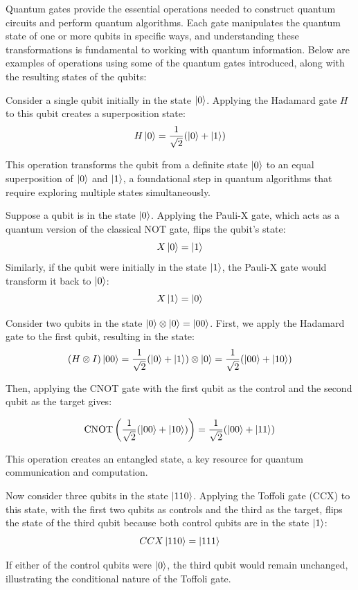 \documentclass{article}
\begin{document}
	Quantum gates provide the essential operations needed to construct quantum circuits and perform quantum algorithms. Each gate manipulates the quantum state of one or more qubits in specific ways, and understanding these transformations is fundamental to working with quantum information. Below are examples of operations using some of the quantum gates introduced, along with the resulting states of the qubits:

	Consider a single qubit initially in the state \( \ket{0} \). Applying the Hadamard gate \( H \) to this qubit creates a superposition state:
	\[
	H \ket{0} = \frac{1}{\sqrt{2}} (\ket{0} + \ket{1})
	\]

	This operation transforms the qubit from a definite state \( \ket{0} \) to an equal superposition of \( \ket{0} \) and \( \ket{1} \), a foundational step in quantum algorithms that require exploring multiple states simultaneously.

	Suppose a qubit is in the state \( \ket{0} \). Applying the Pauli-X gate, which acts as a quantum version of the classical NOT gate, flips the qubit's state:
	\[
	X \ket{0} = \ket{1}
	\]
	Similarly, if the qubit were initially in the state \( \ket{1} \), the Pauli-X gate would transform it back to \( \ket{0} \):
	\[
	X \ket{1} = \ket{0}
	\]

	Consider two qubits in the state \( \ket{0} \otimes \ket{0} = \ket{00} \). First, we apply the Hadamard gate to the first qubit, resulting in the state:
	\[
	(H \otimes I) \ket{00} = \frac{1}{\sqrt{2}} (\ket{0} + \ket{1}) \otimes \ket{0} = \frac{1}{\sqrt{2}} (\ket{00} + \ket{10})
	\]

	Then, applying the CNOT gate with the first qubit as the control and the second qubit as the target gives:

	\[
	\text{CNOT} \left(\frac{1}{\sqrt{2}} (\ket{00} + \ket{10})\right) = \frac{1}{\sqrt{2}} (\ket{00} + \ket{11})
	\]

	This operation creates an entangled state, a key resource for quantum communication and computation.

	Now consider three qubits in the state \( \ket{110} \). Applying the Toffoli gate (CCX) to this state, with the first two qubits as controls and the third as the target, flips the state of the third qubit because both control qubits are in the state \( \ket{1} \):
	\[
	CCX \ket{110} = \ket{111}
	\]

	If either of the control qubits were \( \ket{0} \), the third qubit would remain unchanged, illustrating the conditional nature of the Toffoli gate.
\end{document}
